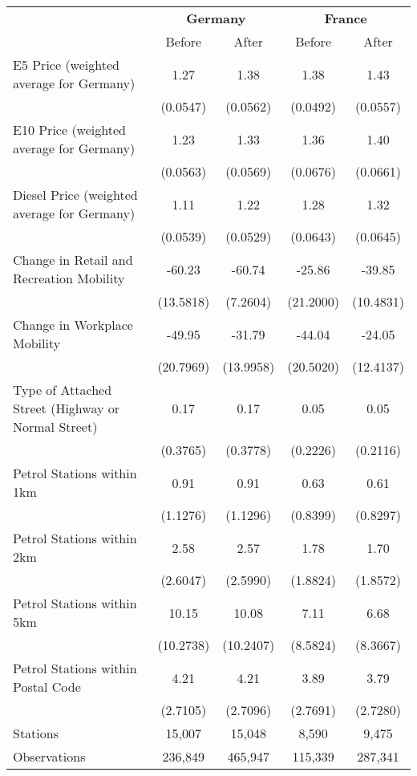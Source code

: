 \begin{tabular}{l*{4}{c}}
\toprule
                    &\multicolumn{2}{c}{\textbf{Germany}}&\multicolumn{2}{c}{\textbf{France}}\\\cmidrule(lr){2-3}\cmidrule(lr){4-5}
                    &\multicolumn{1}{c}{Before}&\multicolumn{1}{c}{After}&\multicolumn{1}{c}{Before}&\multicolumn{1}{c}{After}\\
\midrule
E5 Price (weighted average for Germany)&        1.27&        1.38&        1.38&        1.43\\
                    &    (0.0547)&    (0.0562)&    (0.0492)&    (0.0557)\\
E10 Price (weighted average for Germany)&        1.23&        1.33&        1.36&        1.40\\
                    &    (0.0563)&    (0.0569)&    (0.0676)&    (0.0661)\\
Diesel Price (weighted average for Germany)&        1.11&        1.22&        1.28&        1.32\\
                    &    (0.0539)&    (0.0529)&    (0.0643)&    (0.0645)\\
Change in Retail and Recreation Mobility&      -60.23&      -60.74&      -25.86&      -39.85\\
                    &   (13.5818)&    (7.2604)&   (21.2000)&   (10.4831)\\
Change in Workplace Mobility&      -49.95&      -31.79&      -44.04&      -24.05\\
                    &   (20.7969)&   (13.9958)&   (20.5020)&   (12.4137)\\
Type of Attached Street (Highway or Normal Street)&        0.17&        0.17&        0.05&        0.05\\
                    &    (0.3765)&    (0.3778)&    (0.2226)&    (0.2116)\\
Petrol Stations within 1km&        0.91&        0.91&        0.63&        0.61\\
                    &    (1.1276)&    (1.1296)&    (0.8399)&    (0.8297)\\
Petrol Stations within 2km&        2.58&        2.57&        1.78&        1.70\\
                    &    (2.6047)&    (2.5990)&    (1.8824)&    (1.8572)\\
Petrol Stations within 5km&       10.15&       10.08&        7.11&        6.68\\
                    &   (10.2738)&   (10.2407)&    (8.5824)&    (8.3667)\\
Petrol Stations within Postal Code&        4.21&        4.21&        3.89&        3.79\\
                    &    (2.7105)&    (2.7096)&    (2.7691)&    (2.7280)\\
\midrule
Stations            &      15,007&      15,048&       8,590&       9,475\\
Observations        &     236,849&     465,947&     115,339&     287,341\\
\bottomrule
\end{tabular}
